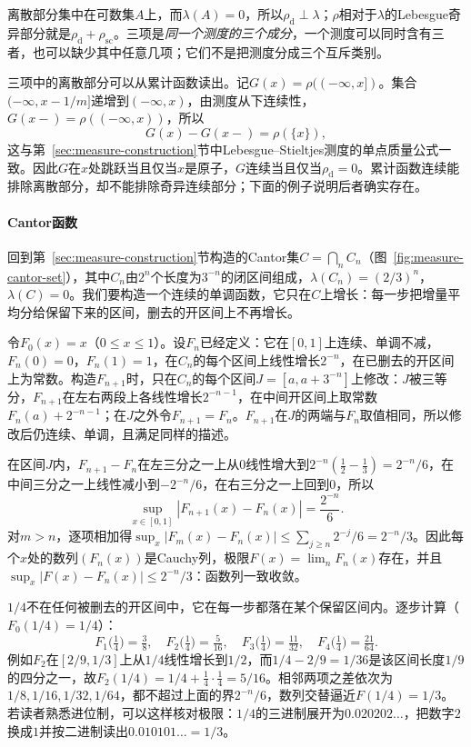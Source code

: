 离散部分集中在可数集$A$上，而$\lambda(A)=0$，所以$\rho_{\mathrm d}\perp\lambda$；$\rho$相对于$\lambda$的Lebesgue奇异部分就是$\rho_{\mathrm d}+\rho_{\mathrm{sc}}$。三项是\emph{同一个测度的三个成分}，一个测度可以同时含有三者，也可以缺少其中任意几项；它们不是把测度分成三个互斥类别。

三项中的离散部分可以从累计函数读出。记$G(x)=\rho((-\infty,x])$。集合$(-\infty,x-1/m]$递增到$(-\infty,x)$，由测度从下连续性，$G(x-)=\rho((-\infty,x))$，所以
\[
 G(x)-G(x-)=\rho(\{x\}),
\]
这与第~\ref{sec:measure-construction}节中Lebesgue–Stieltjes测度的单点质量公式一致。因此$G$在$x$处跳跃当且仅当$x$是原子，$G$连续当且仅当$\rho_{\mathrm d}=0$。累计函数连续能排除离散部分，却不能排除奇异连续部分；下面的例子说明后者确实存在。

\paragraph{Cantor函数}
回到第~\ref{sec:measure-construction}节构造的Cantor集$C=\bigcap_nC_n$（图~\ref{fig:measure-cantor-set}），其中$C_n$由$2^n$个长度为$3^{-n}$的闭区间组成，$\lambda(C_n)=(2/3)^n$，$\lambda(C)=0$。我们要构造一个连续的单调函数，它只在$C$上增长：每一步把增量平均分给保留下来的区间，删去的开区间上不再增长。

令$F_0(x)=x$（$0\le x\le1$）。设$F_n$已经定义：它在$[0,1]$上连续、单调不减，$F_n(0)=0$，$F_n(1)=1$，在$C_n$的每个区间上线性增长$2^{-n}$，在已删去的开区间上为常数。构造$F_{n+1}$时，只在$C_n$的每个区间$J=[a,a+3^{-n}]$上修改：$J$被三等分，$F_{n+1}$在左右两段上各线性增长$2^{-n-1}$，在中间开区间上取常数$F_n(a)+2^{-n-1}$；在$J$之外令$F_{n+1}=F_n$。$F_{n+1}$在$J$的两端与$F_n$取值相同，所以修改后仍连续、单调，且满足同样的描述。

在区间$J$内，$F_{n+1}-F_n$在左三分之一上从$0$线性增大到$2^{-n}(\tfrac12-\tfrac13)=2^{-n}/6$，在中间三分之一上线性减小到$-2^{-n}/6$，在右三分之一上回到$0$，所以
\[
 \sup_{x\in[0,1]}|F_{n+1}(x)-F_n(x)|=\frac{2^{-n}}{6}.
\]
对$m>n$，逐项相加得$\sup_x|F_m(x)-F_n(x)|\le\sum_{j\ge n}2^{-j}/6=2^{-n}/3$。因此每个$x$处的数列$(F_n(x))$是Cauchy列，极限$F(x)=\lim_nF_n(x)$存在，并且$\sup_x|F(x)-F_n(x)|\le2^{-n}/3$：函数列一致收敛。

\begin{example}[在$x=1/4$处逐步计算]
$1/4$不在任何被删去的开区间中，它在每一步都落在某个保留区间内。逐步计算（$F_0(1/4)=1/4$）：
\[
 F_1\bigl(\tfrac14\bigr)=\tfrac38,\quad F_2\bigl(\tfrac14\bigr)=\tfrac5{16},\quad F_3\bigl(\tfrac14\bigr)=\tfrac{11}{32},\quad F_4\bigl(\tfrac14\bigr)=\tfrac{21}{64}.
\]
例如$F_2$在$[2/9,1/3]$上从$1/4$线性增长到$1/2$，而$1/4-2/9=1/36$是该区间长度$1/9$的四分之一，故$F_2(1/4)=1/4+\tfrac14\cdot\tfrac14=5/16$。相邻两项之差依次为$1/8,1/16,1/32,1/64$，都不超过上面的界$2^{-n}/6$，数列交替逼近$F(1/4)=1/3$。若读者熟悉进位制，可以这样核对极限：$1/4$的三进制展开为$0.020202\ldots$，把数字$2$换成$1$并按二进制读出$0.010101\ldots=1/3$。
\end{example}

